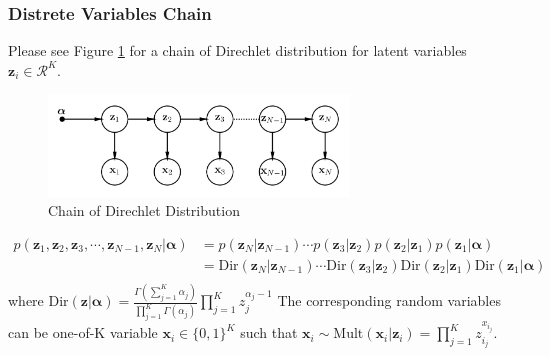 \documentclass[a4]{article}
\begin{document}
\subsubsection{Distrete Variables Chain}
Please see Figure \ref{fig:chain_direchlet} for a chain of Direchlet distribution for latent variables
$\bm{z}_i \in \mathcal{R}^K$.
\begin{figure}[!htb]
\centering
\includegraphics[width=8cm]{chain_direchlet.png}
\caption{Chain of Direchlet Distribution}
\label{fig:chain_direchlet}
\end{figure}
\begin{equation}
\begin{aligned}
p(\bm{z}_1, \bm{z}_2, \bm{z}_3, \cdots, \bm{z}_{N-1}, \bm{z}_{N} | \bm{\alpha}) &= 
p(\bm{z}_{N}|\bm{z}_{N-1})\cdots p(\bm{z}_{3}|\bm{z}_{2})p(\bm{z}_{2}|\bm{z}_{1})p(\bm{z}_{1}|\bm{\alpha})\\
&=\text{Dir}(\bm{z}_{N}|\bm{z}_{N-1})\cdots
\text{Dir}(\bm{z}_{3}|\bm{z}_{2})\text{Dir}(\bm{z}_{2}|\bm{z}_{1})\text{Dir}(\bm{z}_{1}|\bm{\alpha})\\
\end{aligned}
\end{equation}
where
$\text{Dir}(\bm{z}|\bm{\alpha}) =
\frac{\Gamma(\sum_{j=1}^K\alpha_j)}{\prod_{j=1}^K\Gamma(\alpha_j)}
\prod_{j=1}^K z_j^{\alpha_j-1}
$
 The corresponding random variables can be one-of-K variable $\bm{x}_i \in \{0,1\}^K$ such that 
$\bm{x}_i \sim \text{Mult}(\bm{x}_i| \bm{z}_i ) = \prod_{j=1}^K z_{i_j}^{x_{i_j}}$.
\end{document}
